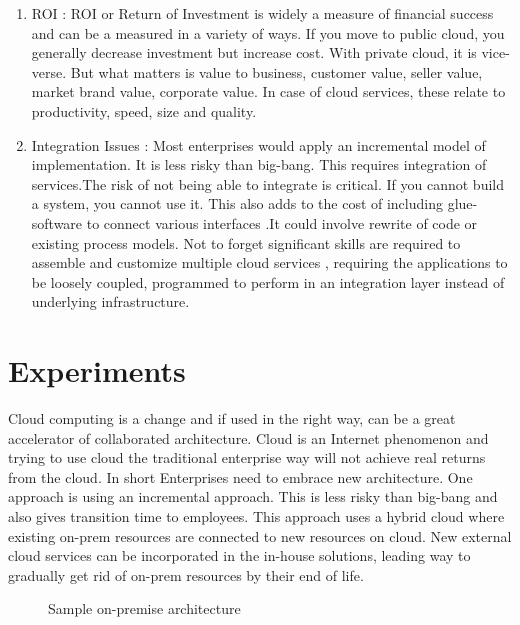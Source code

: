 \documentclass[journal]{hybrid-cloud}
\begin{document}
\begin{enumerate}
	\item ROI : ROI or Return of Investment is widely a measure of financial success and can be a measured in a variety of ways. If you move to public cloud, you generally decrease
investment but increase cost. With private cloud, it is vice-verse. But what matters
is value to business, customer value, seller value, market brand value, corporate value.
In case of cloud services, these relate to productivity, speed, size and quality. \cite{ROI} 

	\item Integration Issues : Most enterprises would apply an incremental model of implementation. It is less risky than big-bang. This requires integration of services.The risk of not being able to integrate is critical. If you cannot build a system, you cannot use it. This also adds to the cost of including glue-software to connect various interfaces .It could involve rewrite of code or existing process models. Not to forget significant skills are required to assemble and customize multiple cloud services , requiring the applications to be loosely coupled, programmed to perform in an integration layer instead of underlying
infrastructure. 

\end{enumerate}





\section{Experiments }

Cloud computing is a change and if used in the right way, can be a great accelerator
of collaborated architecture. Cloud is an Internet phenomenon and trying to use
cloud the traditional enterprise way will not achieve real returns from the cloud. In
short Enterprises need to embrace new architecture.
One approach is using an incremental approach. This is less risky than big-bang
and also gives transition time to employees. This approach uses a hybrid cloud where
existing on-prem resources are connected to new resources on cloud. New external
cloud services can be incorporated in the in-house solutions, leading way to gradually
get rid of on-prem resources by their end of life.


\begin{figure}[h]
	\caption{Sample on-premise architecture}%
	\label{fig:Sample_on-premise_Architecture}
\end{figure}
\end{document}

